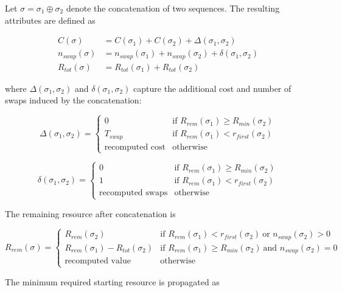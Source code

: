\documentclass[3p, authoryear, 11pt]{elsarticle}
\begin{document}
Let $\sigma = \sigma_1 \oplus \sigma_2$ denote the concatenation of two sequences. 
The resulting attributes are defined as

\[
\begin{aligned}
C(\sigma) &= C(\sigma_1) + C(\sigma_2) + \Delta(\sigma_1,\sigma_2) \\
n_{swap}(\sigma) &= n_{swap}(\sigma_1) + n_{swap}(\sigma_2) + \delta(\sigma_1,\sigma_2) \\
R_{tot}(\sigma) &= R_{tot}(\sigma_1) + R_{tot}(\sigma_2)
\end{aligned}
\]

where $\Delta(\sigma_1,\sigma_2)$ and $\delta(\sigma_1,\sigma_2)$ capture the additional cost and number of swaps induced by the concatenation:

\[
\Delta(\sigma_1,\sigma_2) =
\begin{cases}
0 & \text{if } R_{rem}(\sigma_1) \ge R_{min}(\sigma_2) \\

T_{swap} & \text{if } R_{rem}(\sigma_1) < r_{first}(\sigma_2) \\

\text{recomputed cost} & \text{otherwise}
\end{cases}
\]

\[
\delta(\sigma_1,\sigma_2) =
\begin{cases}
0 & \text{if } R_{rem}(\sigma_1) \ge R_{min}(\sigma_2) \\

1 & \text{if } R_{rem}(\sigma_1) < r_{first}(\sigma_2) \\

\text{recomputed swaps} & \text{otherwise}
\end{cases}
\]

The remaining resource after concatenation is

\[
R_{rem}(\sigma) =
\begin{cases}
R_{rem}(\sigma_2) 
& \text{if } R_{rem}(\sigma_1) < r_{first}(\sigma_2) \ \text{or } n_{swap}(\sigma_2) > 0 \\

R_{rem}(\sigma_1) - R_{tot}(\sigma_2) 
& \text{if } R_{rem}(\sigma_1) \ge R_{min}(\sigma_2) \ \text{and } n_{swap}(\sigma_2)=0 \\

\text{recomputed value} & \text{otherwise}
\end{cases}
\]

The minimum required starting resource is propagated as
\end{document}
